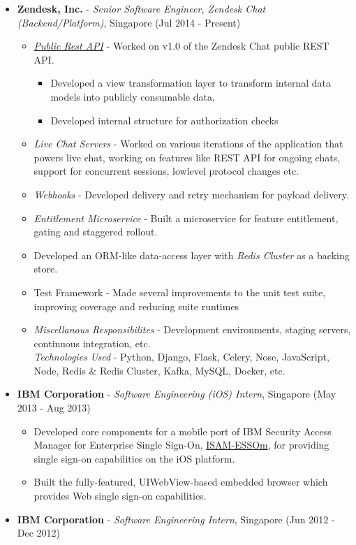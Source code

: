 \begin{itemize}
\tightlist
\item
  \textbf{Zendesk, Inc.} - \emph{Senior Software Engineer, Zendesk Chat
  (Backend/Platform)}, Singapore \hfill (Jul 2014 - Present)

  \begin{itemize}
  \tightlist
  \item
    \emph{\href{https://developer.zendesk.com/rest_api/docs/chat/introduction}{Public
    Rest API}} - Worked on v1.0 of the Zendesk Chat public REST API.

    \begin{itemize}
    \tightlist
    \item
      Developed a view transformation layer to transform internal data
      models into publicly consumable data,
    \item
      Developed internal structure for authorization checks
    \end{itemize}
  \item
    \emph{Live Chat Servers} - Worked on various iterations of the
    application that powers live chat, working on features like REST API
    for ongoing chats, support for concurrent sessions, lowlevel
    protocol changes etc.
  \item
    \emph{Webhooks} - Developed delivery and retry mechanism for payload
    delivery.
  \item
    \emph{Entitlement Microservice} - Built a microservice for feature
    entitlement, gating and staggered rollout.
  \item
    Developed an ORM-like data-access layer with \emph{Redis Cluster} as
    a backing store.
  \item
    Test Framework - Made several improvements to the unit test suite,
    improving coverage and reducing suite runtimes
  \item
    \emph{Miscellanous Responsibilites} - Development environments,
    staging servers, continuous integration, etc.\\
    \emph{Technologies Used} - Python, Django, Flask, Celery, Nose,
    JavaScript, Node, Redis \& Redis Cluster, Kafka, MySQL, Docker, etc.
  \end{itemize}
\item
  \textbf{IBM Corporation} - \emph{Software Engineering (iOS) Intern},
  Singapore \hfill (May 2013 - Aug 2013)

  \begin{itemize}
  \tightlist
  \item
    Developed core components for a mobile port of IBM Security Access
    Manager for Enterprise Single Sign-On,
    \href{https://itunes.apple.com/us/app/isam-essom/id741972716?mt=8}{ISAM-ESSOm},
    for providing single sign-on capabilities on the iOS platform.
  \item
    Built the fully-featured, UIWebView-based embedded browser which
    provides Web single sign-on capabilities.
  \end{itemize}
\item
  \textbf{IBM Corporation} - \emph{Software Engineering Intern},
  Singapore \hfill (Jun 2012 - Dec 2012)


\end{itemize}
